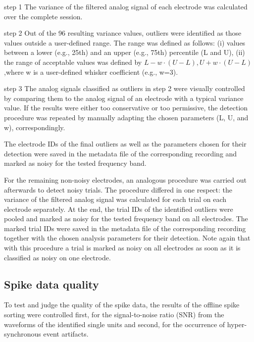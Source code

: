 step 1 The variance of the filtered analog signal of each electrode was calculated over the complete session. 

step 2 Out of the 96 resulting variance values, outliers were identified as those values outside a user-defined range. The range was defined as follows: (i) values between a lower (e.g., 25th) and an upper (e.g., 75th) percentile (L and U), (ii) the range of acceptable values was defined by $L-w\cdot(U-L),U+w\cdot(U-L)$,where w is a user-defined whisker coefficient (e.g., w=3). 

step 3 The analog signals classified as outliers in step 2 were visually controlled by comparing them to the analog signal of an electrode with a typical variance value. If the results were either too conservative or too permissive, the detection procedure was repeated by manually adapting the chosen parameters (L, U, and w), correspondingly. 

The electrode IDs of the final outliers as well as the parameters chosen for their detection were saved in the  metadata file of the corresponding recording and marked as noisy for the tested frequency band. 

For the remaining non-noisy electrodes, an analogous procedure was carried out afterwards to detect noisy trials. The procedure differed in one respect: the variance of the filtered analog signal was calculated for each trial on each electrode separately. At the end, the trial IDs of the identified outliers were pooled and marked as noisy for the tested frequency band on all electrodes. The marked trial IDs were saved in the  metadata file of the corresponding recording together with the chosen analysis parameters for their detection. Note again that with this procedure a trial is marked as noisy on all electrodes as soon as it is classified as noisy on one electrode.

\subsection{Spike data quality}
\label{sec:spike_data_quality}

To test and judge the quality of the spike data, the results of the offline spike sorting were controlled first, for the signal-to-noise ratio (SNR) from the waveforms of the identified single units and second, for the occurrence of hyper-synchronous event artifacts.

